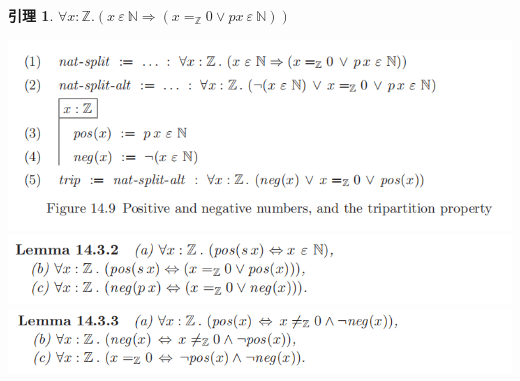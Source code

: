 \documentclass[UTF8]{article}
\newtheorem{lemma}[thm]{引理}
\begin{document}
		\begin{lemma} $\forall x:\mathbb{Z}.(x\ \varepsilon\ \mathbb{N}\Rightarrow(x=_{\mathbb{Z}}0\lor px\ \varepsilon\ \mathbb{N}))$
		\end{lemma}
	
		\noindent\includegraphics[width=0.93\linewidth]{"../imgs/14-4.png"}\\
		\includegraphics[width=0.93\linewidth]{"../imgs/14-5.png"}\\
		\includegraphics[width=0.93\linewidth]{"../imgs/14-6.png"}
\end{document}
